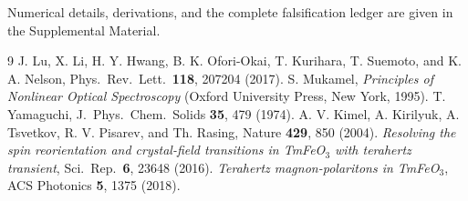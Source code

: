 \documentclass[aps,prl,twocolumn,superscriptaddress,longbibliography]{revtex4-2}
\begin{document}
\begin{acknowledgments}
Numerical details, derivations, and the complete falsification ledger
are given in the Supplemental Material.
\end{acknowledgments}


\begin{thebibliography}{9}
 J. Lu, X. Li, H. Y. Hwang, B. K. Ofori-Okai,
  T. Kurihara, T. Suemoto, and K. A. Nelson,
  Phys.\ Rev.\ Lett.\ \textbf{118}, 207204 (2017).
 S. Mukamel, \emph{Principles of Nonlinear Optical
  Spectroscopy} (Oxford University Press, New York, 1995).
 T. Yamaguchi,
  J.\ Phys.\ Chem.\ Solids \textbf{35}, 479 (1974).
 A. V. Kimel, A. Kirilyuk, A. Tsvetkov, R. V.
  Pisarev, and Th. Rasing, Nature \textbf{429}, 850 (2004).
 \emph{Resolving the spin reorientation and
  crystal-field transitions in TmFeO$_3$ with terahertz transient},
  Sci.\ Rep.\ \textbf{6}, 23648 (2016).
 \emph{Terahertz magnon-polaritons in TmFeO$_3$},
  ACS Photonics \textbf{5}, 1375 (2018).
\end{thebibliography}
\end{document}
